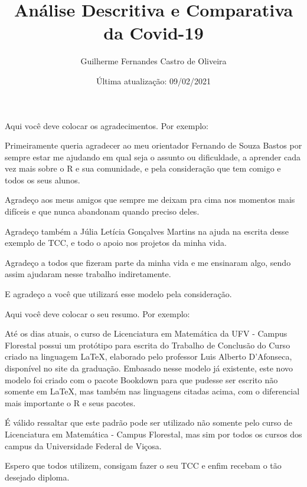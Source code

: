 \documentclass[
  fleqn,ebook]{ic}
\title{Análise Descritiva e Comparativa da Covid-19}
\author{Guilherme Fernandes Castro de Oliveira}
\date{Última atualização: 09/02/2021}
\renewcommand\maketitle{}
\begin{document}
\maketitle

\begin{acknowledgement}

  Aqui você deve colocar os agradecimentos. Por exemplo:
  
  Primeiramente queria agradecer ao meu orientador Fernando de Souza Bastos por
  sempre estar me ajudando em qual seja o assunto ou dificuldade, a aprender
  cada vez mais sobre o R e sua comunidade, e pela consideração que tem comigo e
  todos os seus alunos.
  
  Agradeço aos meus amigos que sempre me deixam pra cima nos momentos mais
  difíceis e que nunca abandonam quando preciso deles.

  Agradeço também a Júlia Letícia Gonçalves Martins na ajuda na escrita desse
  exemplo de TCC, e todo o apoio nos projetos da minha vida.
  
  Agradeço a todos que fizeram parte da minha vida e me ensinaram algo, sendo
  assim ajudaram nesse trabalho indiretamente.
  
  E agradeço a você que utilizará esse modelo pela consideração.

\end{acknowledgement}
\begin{Resumo}
  
  Aqui você deve colocar o seu resumo. Por exemplo:
  
  Até os dias atuais, o curso de Licenciatura em Matemática da UFV - Campus 
  Florestal possui um protótipo para escrita do Trabalho de Conclusão do Curso
  criado na linguagem LaTeX, elaborado pelo professor Luis Alberto D'Afonseca, 
  disponível no site da graduação. Embasado nesse modelo já existente, este novo
  modelo foi criado com o pacote Bookdown para que pudesse ser escrito não 
  somente em LaTeX, mas também nas linguagens citadas acima, com o diferencial 
  mais importante o R e seus pacotes.
  
  É válido ressaltar que este padrão pode ser utilizado não somente pelo curso
  de Licenciatura em Matemática - Campus Florestal, mas sim por todos os cursos
  dos campus da Universidade Federal de Viçosa.
  
  Espero que todos utilizem, consigam fazer o seu TCC e enfim recebam o tão
  desejado diploma.
  
\end{Resumo}
\end{document}
